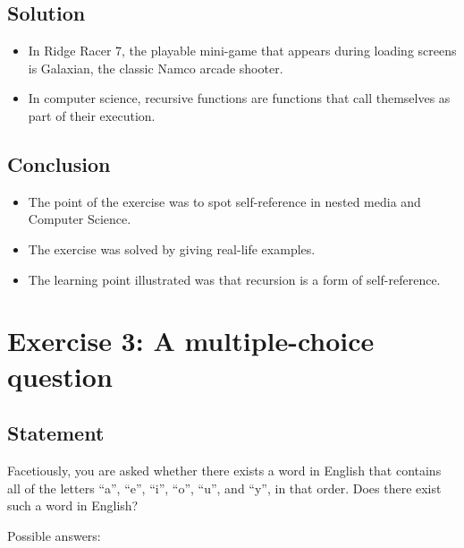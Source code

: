 \documentclass[12pt]{article}
\begin{document}

\subsection{Solution}

\begin{itemize}
\item In Ridge Racer 7, the playable mini-game that appears during loading
  screens is Galaxian, the classic Namco arcade shooter.
\item In computer science, recursive functions are functions that call
  themselves as part of their execution.
\end{itemize}


\subsection{Conclusion}

\begin{itemize}

\item
  The point of the exercise was to spot self-reference in nested media and Computer Science.

\item
  The exercise was solved by giving real-life examples.

\item
  The learning point illustrated was that recursion is a form of self-reference.

\end{itemize}


\newpage

\section{Exercise 3: A multiple-choice question}


\subsection{Statement}

Facetiously, you are asked whether there exists a word in English that contains
all of the letters ``a'', ``e'', ``i'', ``o'', ``u'', and ``y'', in that order.
Does there exist such a word in English?

Possible answers:
\end{document}
